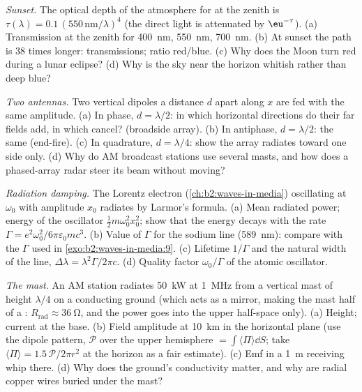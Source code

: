 \begin{exercise}[$\star\star$]\label{exo:b2:dipole-radiation:8}
\emph{Sunset.} The optical depth of the atmosphere for  at the zenith is $\tau(\lambda) = 0.1\,(550\,\text{nm}/\lambda)^4$ (the
direct light is attenuated by $\eu^{-\tau}$). (a) Transmission at the
zenith for \qty{400}{nm}, \qty{550}{nm}, \qty{700}{nm}. (b) At sunset the path
is $38$ times longer: transmissions; ratio red/blue. (c) Why does the
Moon turn red during a lunar eclipse? (d) Why is the sky near the
horizon whitish rather than deep blue?
\end{exercise}

\begin{exercise}[$\star\star$]\label{exo:b2:dipole-radiation:9}
\emph{Two antennas.} Two vertical dipoles a distance $d$ apart along
$x$ are fed with the same amplitude. (a) In phase, $d = \lambda/2$: in which
horizontal directions do their far fields add, in which cancel?
(broadside array). (b) In antiphase, $d = \lambda/2$: the same (end-fire).
(c) In quadrature, $d = \lambda/4$: show the array radiates toward one
side only. (d) Why do AM broadcast stations use several masts, and
how does a phased-array radar steer its beam without moving?
\end{exercise}

\begin{exercise}[$\star\star\star$]\label{exo:b2:dipole-radiation:10}
\emph{Radiation damping.} The Lorentz electron (\cref{ch:b2:waves-in-media})
oscillating at $\omega_0$ with amplitude $x_0$ radiates by Larmor's formula.
(a) Mean radiated power; energy of the oscillator $\tfrac12m\omega_0^2x_0^2$;
show that the energy decays with the rate $\Gamma = e^2\omega_0^2/6\pi\varepsilon_0mc^3$.
(b) Value of $\Gamma$ for the sodium line (\qty{589}{nm}): compare with the
$\Gamma$ used in \cref{exo:b2:waves-in-media:9}. (c) Lifetime $1/\Gamma$ and the
natural width of the line, $\Delta\lambda = \lambda^2\Gamma/2\pi c$. (d) Quality factor
$\omega_0/\Gamma$ of the atomic oscillator.
\end{exercise}

\begin{exercise}[$\star\star\star$]\label{exo:b2:dipole-radiation:11}
\emph{The mast.} An AM station radiates \qty{50}{kW} at \qty{1}{MHz} from a
vertical mast of height $\lambda/4$ on a conducting ground (which acts as
a mirror, making the mast half of a : $R_{\text{rad}} \approx
\qty{36}{\ohm}$, and the power goes into the upper half-space only). (a)
Height; current at the base. (b) Field amplitude at \qty{10}{km} in the
horizontal plane (use the dipole pattern, $\mathcal P$ over the upper
hemisphere $= \int\langle\Pi\rangle\dd S$; take $\langle\Pi\rangle = 1.5\,
\mathcal P/2\pi r^2$ at the horizon as a fair estimate). (c) Emf in a
\qty{1}{m} receiving whip there. (d) Why does the ground's conductivity
matter, and why are radial copper wires buried under the mast?
\end{exercise}

